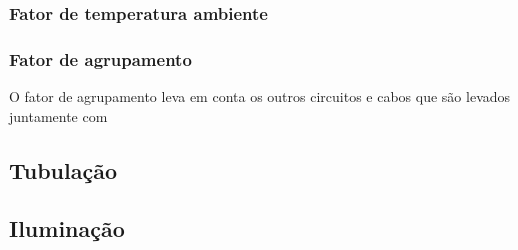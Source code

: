 \subsubsection{Fator de temperatura ambiente}

\subsubsection{Fator de agrupamento}
O fator de agrupamento leva em conta os outros circuitos e cabos que são levados juntamente com 

\subsection{Tubulação}


\subsection{Iluminação}
